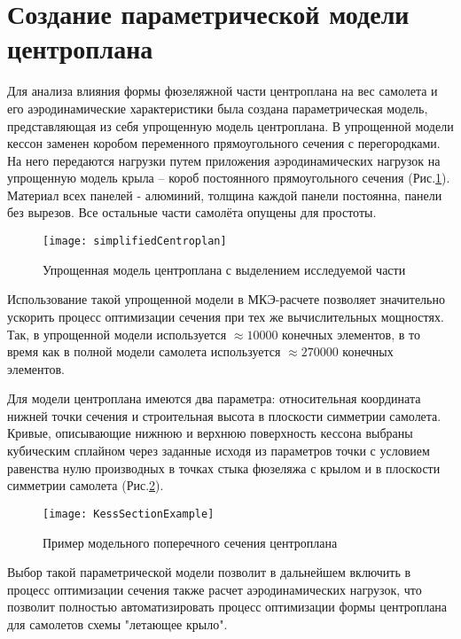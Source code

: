 \section{Создание параметрической модели центроплана}
\label{sec:creationOfModel}

Для анализа влияния формы фюзеляжной части центроплана на вес самолета и его аэродинамические характеристики была создана параметрическая модель, представляющая из себя упрощенную модель центроплана. В упрощенной модели кессон заменен коробом переменного прямоугольного сечения с перегородками. На него передаются нагрузки путем приложения аэродинамических нагрузок на упрощенную модель крыла -- короб постоянного прямоугольного сечения (Рис.\ref{fig:CurvedKessonPatran}). Материал всех панелей - алюминий, толщина каждой панели постоянна, панели без вырезов. Все остальные части самолёта опущены для простоты.  



\begin{figure}[ht]
\centering
\texttt{[image: simplifiedCentroplan]}
\caption{Упрощенная модель центроплана с выделением исследуемой части}
\label{fig:CurvedKessonPatran}
\end{figure}

Использование такой упрощенной модели в МКЭ-расчете позволяет значительно ускорить процесс оптимизации сечения при тех же вычислительных мощностях. Так, в упрощенной модели используется $\approx10000$ конечных элементов, в то время как в полной модели самолета используется $\approx270000$ конечных элементов.

Для модели центроплана имеются два параметра: относительная координата нижней точки сечения и строительная высота в плоскости симметрии самолета. Кривые, описывающие нижнюю и верхнюю поверхность кессона выбраны кубическим сплайном через заданные исходя из параметров точки с условием равенства нулю производных в точках стыка фюзеляжа с крылом и в плоскости симметрии самолета (Рис.\ref{fig:KessSectionExample}).

\begin{figure}[ht]
\centering
\texttt{[image: KessSectionExample]}
%
\caption{Пример модельного поперечного сечения центроплана}
\label{fig:KessSectionExample}
\end{figure}


Выбор такой параметрической модели позволит в дальнейшем включить в процесс оптимизации сечения также расчет аэродинамических нагрузок, что позволит полностью автоматизировать процесс оптимизации формы центроплана для самолетов схемы "летающее крыло". 

